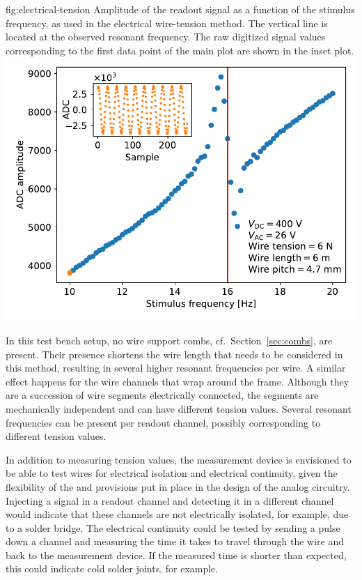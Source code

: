 \begin{dunefigure}{fig:electrical-tension}
{Amplitude of the readout signal as a function of the stimulus frequency, as used in the electrical wire-tension method. The vertical line is located at the observed resonant frequency. The raw digitized signal values corresponding to the first data point of the main plot are shown in the inset plot.}
\includegraphics[height=0.33\textheight]{graphics/sp-apa-electrical-tension.pdf}
\end{dunefigure}

In this test bench setup, no wire support combs, cf.\ Section~\ref{sec:combs}, are present. Their presence shortens the wire length that needs to be considered in this method, resulting in several higher resonant frequencies per wire. A similar effect happens for the wire channels that wrap around the  frame. Although they are a succession of wire segments electrically connected, the segments are mechanically independent and can have different tension values. Several resonant frequencies can be present per readout channel, possibly corresponding to different tension values.

In addition to measuring tension values, the measurement device is envisioned to be able to test wires for electrical isolation and electrical continuity, given the flexibility of the  and provisions put in place in the design of the analog circuitry. Injecting a signal in a readout channel and detecting it in a different channel would indicate that these channels are not electrically isolated, for example, due to a solder bridge. The electrical continuity could be tested by sending a pulse down a channel and measuring the time it takes to travel through the wire and back to the measurement device.  If the measured time is shorter than expected, this could indicate cold solder joints, for example.

